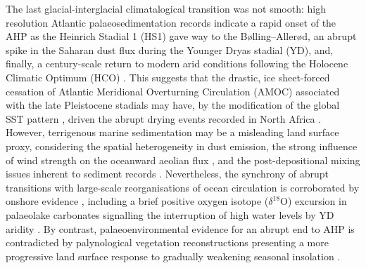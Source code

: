 \documentclass[a4paper]{article}
\newcommand{\delO}{\ensuremath{\delta ^{18}}O}
\begin{document}
The last glacial-interglacial climatalogical transition was not smooth: high resolution Atlantic palaeosedimentation records indicate a rapid onset of the AHP as the Heinrich Stadial 1 (HS1) gave way to the Bølling–Allerød, an abrupt spike in the Saharan dust flux during the Younger Dryas stadial (YD), and, finally, a century-scale return to modern arid conditions following the Holocene Climatic Optimum (HCO) \parencite{demenocal2000abrupt, kuhlmann2004transition, adkins2006african, mcgee2013magnitude, ehrmann2013dynamics, collins2013abrupt, williams2016glacial}.
This suggests that the drastic, ice sheet-forced cessation of Atlantic Meridional Overturning Circulation (AMOC) associated with the late Pleistocene stadials \parencite{mcmanus2004collapse, lynch2017atlantic, ritz2013estimated} may have, by the modification of the global SST pattern \parencite{boyle1987north, kiefer2005patterns, kienast2006eastern, barker2009interhemispheric}, driven the abrupt drying events recorded in North Africa \parencite{weldeab2007155, mulitza2008sahel, collins2013abrupt}. 
However, terrigenous marine sedimentation may be a misleading land surface proxy, considering the spatial heterogeneity in dust emission, the strong influence of wind strength on the oceanward aeolian flux \parencite{ruddiman1997tropical, mcgee2010gustiness, parker2016new}, and the post-depositional mixing issues inherent to sediment records \parencite{mahowald1999dust, giresse2003late, maslin2003evidence}.
Nevertheless, the synchrony of abrupt transitions with large-scale reorganisations of ocean circulation is corroborated by onshore evidence \parencite{gasse1994abrupt, garcin2007abrupt, talbot2007abrupt}, including a brief positive oxygen isotope (\delO) excursion in palaeolake carbonates signalling the interruption of high water levels by YD aridity \parencite{gasse1990arid}.
By contrast, palaeoenvironmental evidence for an abrupt end to AHP \parencite{gasse1990arid, salzmann2005dahomey, tierney2013abrupt, tierney2017rainfall} is contradicted by palynological vegetation reconstructions presenting a more progressive land surface response to gradually weakening seasonal insolation \parencite{kropelin2008climate, lezine2009timing, vincens2010vegetation, amaral2013palynological, shanahan2015time}. 
\end{document}
